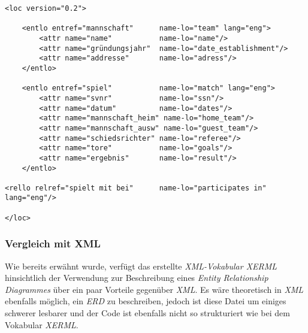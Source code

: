 \begin{verbatim}
<loc version="0.2">

    <entlo entref="mannschaft"      name-lo="team" lang="eng">
        <attr name="name"           name-lo="name"/>
        <attr name="gründungsjahr"  name-lo="date_establishment"/>
        <attr name="addresse"       name-lo="adress"/>
    </entlo>

    <entlo entref="spiel"           name-lo="match" lang="eng">
        <attr name="svnr"           name-lo="ssn"/>
        <attr name="datum"          name-lo="dates"/>
        <attr name="mannschaft_heim" name-lo="home_team"/>
        <attr name="mannschaft_ausw" name-lo="guest_team"/>
        <attr name="schiedsrichter" name-lo="referee"/>
        <attr name="tore"           name-lo="goals"/>
        <attr name="ergebnis"       name-lo="result"/>
    </entlo>

<rello relref="spielt mit bei"      name-lo="participates in" lang="eng"/>

</loc>
\end{verbatim}
\pra
\subsubsection{Vergleich mit XML}
\noindent
Wie bereits erwähnt wurde, verfügt das erstellte \textit{XML-Vokabular XERML} hinsichtlich der Verwendung zur Beschreibung eines \textit{Entity Relationship Diagrammes} über ein paar Vorteile gegenüber \textit{XML}. Es wäre theoretisch in \textit{XML} ebenfalls möglich, ein \textit{ERD} zu beschreiben, jedoch ist diese Datei um einiges schwerer lesbarer und der Code ist ebenfalls nicht so strukturiert wie bei dem Vokabular \textit{XERML}.  
